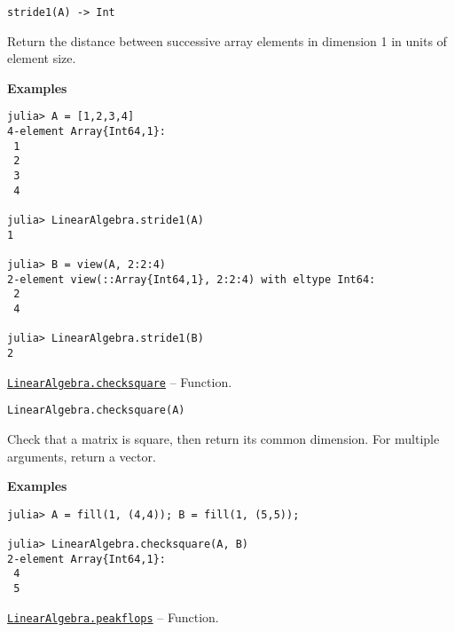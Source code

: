 \begin{adjustwidth}{2em}{0pt}


\begin{verbatim}
stride1(A) -> Int
\end{verbatim}

Return the distance between successive array elements in dimension 1 in units of element size.

\textbf{Examples}


\begin{verbatim}
julia> A = [1,2,3,4]
4-element Array{Int64,1}:
 1
 2
 3
 4

julia> LinearAlgebra.stride1(A)
1

julia> B = view(A, 2:2:4)
2-element view(::Array{Int64,1}, 2:2:4) with eltype Int64:
 2
 4

julia> LinearAlgebra.stride1(B)
2
\end{verbatim}



\end{adjustwidth}
\hypertarget{3700476694218805076}{} 
\hyperlink{3700476694218805076}{\texttt{LinearAlgebra.checksquare}}  -- {Function.}

\begin{adjustwidth}{2em}{0pt}


\begin{verbatim}
LinearAlgebra.checksquare(A)
\end{verbatim}

Check that a matrix is square, then return its common dimension. For multiple arguments, return a vector.

\textbf{Examples}


\begin{verbatim}
julia> A = fill(1, (4,4)); B = fill(1, (5,5));

julia> LinearAlgebra.checksquare(A, B)
2-element Array{Int64,1}:
 4
 5
\end{verbatim}



\end{adjustwidth}
\hypertarget{2023980161110391079}{} 
\hyperlink{2023980161110391079}{\texttt{LinearAlgebra.peakflops}}  -- {Function.}


